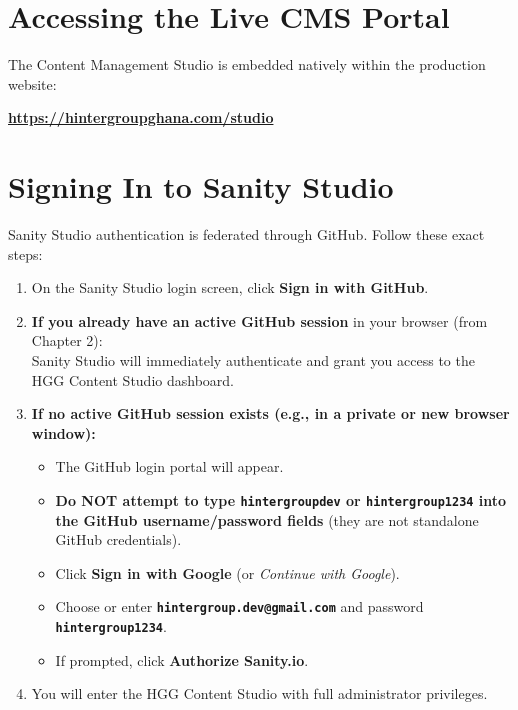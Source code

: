\documentclass[11pt,a4paper,oneside]{book}
\begin{document}
\section{Accessing the Live CMS Portal}
The Content Management Studio is embedded natively within the production website:
\begin{center}
  \Large\bfseries\url{https://hintergroupghana.com/studio}
\end{center}

\section{Signing In to Sanity Studio}
Sanity Studio authentication is federated through GitHub. Follow these exact steps:
\begin{enumerate}[leftmargin=*,label=\textbf{\arabic*.}]
  \item On the Sanity Studio login screen, click \textbf{Sign in with GitHub}.
  \item \textbf{If you already have an active GitHub session} in your browser (from Chapter 2):\\
    Sanity Studio will immediately authenticate and grant you access to the HGG Content Studio dashboard.
  \item \textbf{If no active GitHub session exists (e.g., in a private or new browser window):}
    \begin{itemize}[leftmargin=1.2cm]
      \item The GitHub login portal will appear.
      \item \textbf{Do NOT attempt to type \texttt{hintergroupdev} or \texttt{hintergroup1234} into the GitHub username/password fields} (they are not standalone GitHub credentials).
      \item Click \textbf{Sign in with Google} (or \textit{Continue with Google}).
      \item Choose or enter \textbf{\texttt{hintergroup.dev@gmail.com}} and password \textbf{\texttt{hintergroup1234}}.
      \item If prompted, click \textbf{Authorize Sanity.io}.
    \end{itemize}
  \item You will enter the HGG Content Studio with full administrator privileges.
\end{enumerate}
\end{document}
